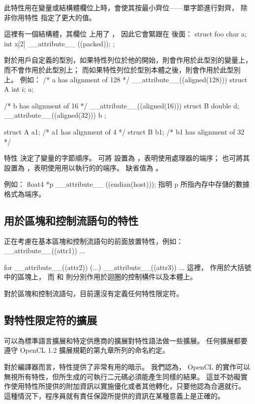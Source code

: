 此特性用在變量或結構體欄位上時，會使其按最小齊位——單字節進行對齊，
除非你用特性  指定了更大的值。

這裡有一個結構體，其欄位  上用了 ，
因此它會緊跟在  後面：
\startclc
struct foo
{
	char a;
	int x[2] __attribute__ ((packed));
};
\stopclc
\stopclOption

對於用戶自定義的型別，如果特性列位於他的開始，則會作用於此型別的變量上，而不會作用於此型別上；
而如果特性列位於型別本體之後，則會作用於此型別上。
例如：
\startclc
/* a has alignment of 128 */
__attribute__((aligned(128))) struct A {int i;} a;

/* b has alignment of 16 */
__attribute__((aligned(16))) struct B {double d;}
			__attribute__((aligned(32))) b ;

struct A a1;	/* a1 has alignment of 4 */
struct B b1;	/* b1 has alignment of 32 */
\stopclc

特性  決定了變量的字節順序。
可將  設置為 ，表明使用處理器的端序；
也可將其設置為 ，表明使用用以執行的的端序。
缺省值為 。

例如：
\startclc
float4 *p __attribute__ ((endian(host)));
\stopclc
指明 p 所指內存中存儲的數據格式為端序。
\stopclOption

\subsection{用於區塊和控制流語句的特性}

正在考慮在基本區塊和控制流語句的前面放置特性，例如：
\startclc
__attribute__((attr1)) {...}

for __attribute__((attr2)) (...) __attribute__((attr3)) {...}
\stopclc
這裡，  作用於大括號中的區塊上，
而  和  則分別作用於迴圈的控制構件以及本體上。

對於區塊和控制流語句，目前還沒有定義任何特性限定符。

\subsection{對特性限定符的擴展}

可以為標準語言擴展和特定供應商的擴展對特性語法做一些擴展。
任何擴展都要遵守 OpenCL 1.2 擴展規範的第九章所列的命名約定。

對於編譯器而言，特性提供了非常有用的暗示。
我們認為， OpenCL 的實作可以無視所有特性，但所生成的可執行二元碼必須能產生同樣的結果。
這並不妨礙實作使用特性所提供的附加資訊以實施優化或者其他轉化，只要他認為合適就行。
這種情況下，程序員就有責任保證所提供的資訊在某種意義上是正確的。


